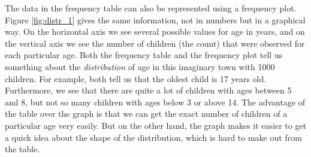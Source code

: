 \begin{kframe}


{\ttfamily\noindent\bfseries{}}\end{kframe}

\begin{knitrout}
\color{fgcolor}\begin{kframe}


{\ttfamily\noindent\bfseries{}}\end{kframe}
\end{knitrout}

The data in the frequency table can also be represented using a frequency plot. Figure \ref{fig:distr_1} gives the same information, not in numbers but in a graphical way. On the horizontal axis we see several possible values for age in years, and on the vertical axis we see the number of children (the count) that were observed for each particular age. Both the frequency table and the frequency plot tell us something about the \textit{distribution} of age in this imaginary town with 1000 children. For example, both tell us that the oldest child is 17 years old. Furthermore, we see that there are quite a lot of children with ages between 5 and 8, but not so many children with ages below 3 or above 14. The advantage of the table over the graph is that we can get the exact number of children of a particular age very easily. But on the other hand, the graph makes it easier to get a quick idea about the shape of the distribution, which is hard to make out from the table.



